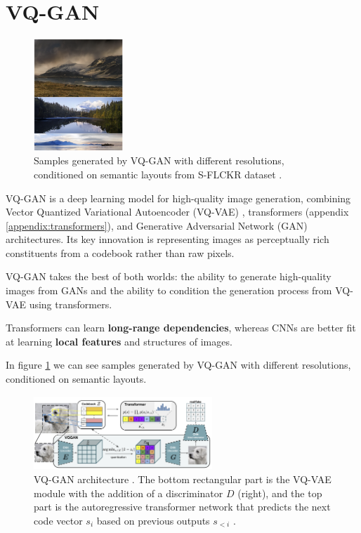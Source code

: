 \section{VQ-GAN}
\label{vqgan}

\begin{figure}
    \centering
    \includegraphics[width=0.3\textwidth]{images/vqgan_samples.png}
    \caption{Samples generated by VQ-GAN with different resolutions, conditioned on semantic layouts from S-FLCKR dataset \cite{vqgan}.}
    \label{fig:vqgan_samples}
\end{figure}


VQ-GAN \cite{vqgan} is a deep learning model for high-quality image generation, combining Vector Quantized Variational Autoencoder (VQ-VAE) \cite{vqvae}, transformers \cite{transformer} (appendix \ref{appendix:transformers}), and Generative Adversarial Network (GAN) \cite{gan} architectures. Its key innovation is representing images as perceptually rich constituents from a codebook rather than raw pixels.

VQ-GAN takes the best of both worlds: the ability to generate high-quality images from GANs and the ability to condition the generation process from VQ-VAE using transformers.

Transformers can learn \textbf{long-range dependencies}, whereas CNNs \cite{cnn} are better fit at learning \textbf{local features} and structures of images.

In figure \ref{fig:vqgan_samples} we can see samples generated by VQ-GAN with different resolutions, conditioned on semantic layouts.

\begin{figure}
    \centering
    \includegraphics[width=0.6\textwidth]{images/vqgan_architecture.png}
    \caption{VQ-GAN architecture \cite{vqgan}. The bottom rectangular part is the VQ-VAE module with the addition of a discriminator $D$ (right), and the top part is the autoregressive transformer network that predicts the next code vector $s_i$ based on previous outputs $s_{<i}$ \cite{vqgan}.}
    \label{fig:vqgan_architecture}
\end{figure}

